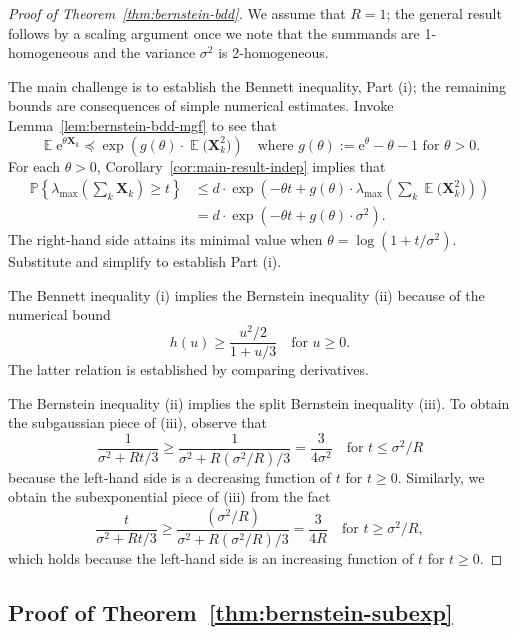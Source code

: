 \documentclass[11pt,letterpaper,twoside,reqno,draft]{amsart}
\theoremstyle{remark}
\numberwithin{equation}{section}
\numberwithin{thm}{section}
\begin{document}
\begin{proof}[Proof of Theorem~\ref{thm:bernstein-bdd}]
We assume that $R = 1$; the general result follows by a scaling argument once we note that the summands are 1-homogeneous and the variance $\sigma^2$ is 2-homogeneous.

The main challenge is to establish the Bennett inequality, Part (i); the remaining bounds are consequences of simple numerical estimates.
Invoke Lemma~\ref{lem:bernstein-bdd-mgf} to see that
$$
{\operatorname{\mathbb{E}}} {\mathrm{e}}^{\theta {\bm{{X}}}_k}
	{\preccurlyeq} \exp\left( g(\theta) \cdot {\operatorname{\mathbb{E}}} \big({\bm{{X}}}_k^2 \big) \right)
\quad\text{where $g(\theta) := {\mathrm{e}}^{\theta} - \theta - 1$ for $\theta > 0$}.
$$
For each $\theta > 0$, Corollary~\ref{cor:main-result-indep} implies that
\begin{align*}
{\mathbb{P}\left\{ {{ \lambda_{\max}\left( \sum\nolimits_k {\bm{{X}}}_k \right) \geq t }} \right\}}
	&\leq d \cdot \exp\left( -\theta t + g(\theta) \cdot \lambda_{\max}\left(
	\sum\nolimits_k {\operatorname{\mathbb{E}}} \big({\bm{{X}}}_k^2 \big) \right) \right) \\
	&= d \cdot \exp\left( -\theta t + g(\theta) \cdot \sigma^2 \right).
\end{align*}
The right-hand side attains its minimal value when $\theta = \log(1 + t / \sigma^2)$.  Substitute and simplify to establish Part (i).

The Bennett inequality (i) implies the Bernstein inequality (ii) because of the numerical bound
$$
h(u) \geq \frac{u^2/2}{1 + u/3}
\quad\text{for $u \geq 0$.}
$$
The latter relation is established by comparing derivatives.

The Bernstein inequality (ii) implies the split Bernstein inequality (iii).  To obtain the subgaussian piece of (iii), observe that
$$
\frac{1}{\sigma^2 + Rt/3} \geq \frac{1}{\sigma^2 + R (\sigma^2/R) / 3}
= \frac{3}{4\sigma^2}
\quad\text{for $t \leq \sigma^2/R$}
$$
because the left-hand side is a decreasing function of $t$ for $t \geq 0$.  Similarly, we obtain the subexponential piece of (iii) from the fact
$$
\frac{t}{\sigma^2 + Rt/3} \geq \frac{(\sigma^2/R)}{\sigma^2 + R (\sigma^2/R) / 3}
= \frac{3}{4R}
\quad\text{for $t \geq \sigma^2/R$},
$$
which holds because the left-hand side is an increasing function of $t$ for $t \geq 0$.
\end{proof} 

\subsection{Proof of Theorem~\ref{thm:bernstein-subexp}}
\end{document}

